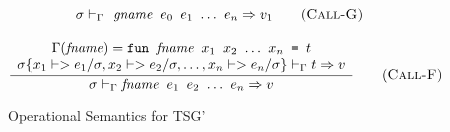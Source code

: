 \documentclass[10pt]{../sigplanconf}
\newcommand{\nfrac}[2]{\frac{\displaystyle{#1}}{\displaystyle{#2}}}
\newcommand{\tagsc}[1]{\tag{\scshape #1}}
\begin{document}
\begin{figure}
\begin{equation}
{\begin{array}{c}
    \end{array}
  }{
    \sigma |-_\Gamma \texttt{\textit{\rmfamily gname} $e_0$ $e_1$ $\ldots$ $e_n$} => v_1
  }
  \tagsc{Call-G}
\end{equation}

\begin{equation}
  \nfrac{
    \begin{array}{c}
      \Gamma(\textit{fname}) =
        \texttt{fun \textit{\rmfamily fname} $x_1$ $x_2$ $\ldots$ $x_n$ = $t$}
        \\
      \sigma\{x_1 |-> e_1/\sigma, x_2 |-> e_2/\sigma, \ldots, x_n |-> e_n/\sigma\} |-_\Gamma t => v
    \end{array}
  }{
    \sigma |-_\Gamma \texttt{\textit{\rmfamily fname} $e_1$ $e_2$ $\ldots$ $e_n$} => v
  } \tagsc{Call-F}
\end{equation}


\caption{Operational Semantics for TSG'}
\label{fig:semantics}
\end{figure}
\end{document}

